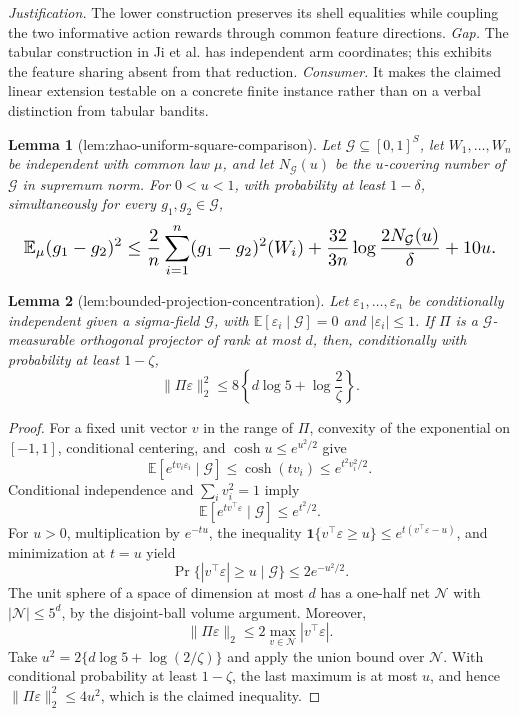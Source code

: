 \documentclass{article}
\newtheorem{lemma}{Lemma}
\begin{document}
\par\smallskip\noindent \textit{Justification.} The lower construction preserves its shell equalities while coupling the two informative action rewards through common feature directions. \textit{Gap.} The tabular construction in Ji et al. has independent arm coordinates; this exhibits the feature sharing absent from that reduction. \textit{Consumer.} It makes the claimed linear extension testable on a concrete finite instance rather than on a verbal distinction from tabular bandits.

\begin{lemma}[lem:zhao-uniform-square-comparison]\label{lem:zhao-uniform-square-comparison}
Let \(\mathcal G\subseteq[0,1]^S\), let \(W_1,\ldots,W_n\) be independent with common law \(\mu\), and let \(N_{\mathcal G}(u)\) be the \(u\)-covering number of \(\mathcal G\) in supremum norm. For \(0<u<1\), with probability at least \(1-\delta\), simultaneously for every \(g_1,g_2\in\mathcal G\),
\[
\makebox[\linewidth][c]{\resizebox{0.98\linewidth}{!}{\(\displaystyle \mathbb E_\mu(g_1-g_2)^2
\le \frac2n\sum_{i=1}^n(g_1-g_2)^2(W_i)
+\frac{32}{3n}\log\frac{2N_{\mathcal G}(u)}{\delta}+10u.\)}}
\]
\end{lemma}

\begin{lemma}[lem:bounded-projection-concentration]\label{lem:bounded-projection-concentration}
Let \(\varepsilon_1,\ldots,\varepsilon_n\) be conditionally independent given a sigma-field \(\mathcal G\), with \(\mathbb E[\varepsilon_i\mid\mathcal G]=0\) and \(|\varepsilon_i|\le1\). If \(\Pi\) is a \(\mathcal G\)-measurable orthogonal projector of rank at most \(d\), then, conditionally with probability at least \(1-\zeta\),
\[
\|\Pi\varepsilon\|_2^2
\le8\left\{d\log5+\log\frac2\zeta\right\}.
\]
\end{lemma}
\begin{proof}
For a fixed unit vector \(v\) in the range of \(\Pi\), convexity of the exponential on \([-1,1]\), conditional centering, and \(\cosh u\le e^{u^2/2}\) give
\[
\mathbb E\left[e^{t v_i\varepsilon_i}\mid\mathcal G\right]
\le\cosh(tv_i)
\le e^{t^2v_i^2/2}.
\]
Conditional independence and \(\sum_i v_i^2=1\) imply
\[
\mathbb E\left[e^{t v^\top\varepsilon}\mid\mathcal G\right]\le e^{t^2/2}.
\]
For \(u>0\), multiplication by \(e^{-tu}\), the inequality \(\mathbf 1\{v^\top\varepsilon\ge u\}\le e^{t(v^\top\varepsilon-u)}\), and minimization at \(t=u\) yield
\[
\Pr\{|v^\top\varepsilon|\ge u\mid\mathcal G\}\le2e^{-u^2/2}.
\]
The unit sphere of a space of dimension at most \(d\) has a one-half net \(\mathcal N\) with \(|\mathcal N|\le5^d\), by the disjoint-ball volume argument. Moreover,
\[
\|\Pi\varepsilon\|_2
\le2\max_{v\in\mathcal N}|v^\top\varepsilon|.
\]
Take \(u^2=2\{d\log5+\log(2/\zeta)\}\) and apply the union bound over \(\mathcal N\). With conditional probability at least \(1-\zeta\), the last maximum is at most \(u\), and hence \(\|\Pi\varepsilon\|_2^2\le4u^2\), which is the claimed inequality.
\end{proof}
\end{document}
